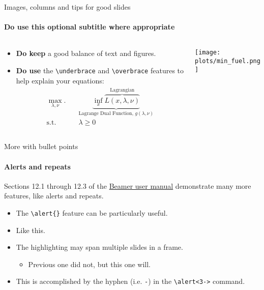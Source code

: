 \documentclass{beamer}
\newcommand{\hrefcol}[2]{\textcolor{uihteal}{\href{#1}{#2}}}
\begin{document}
\begin{frame}[fragile]{Images, columns and tips for good slides}
\framesubtitle{\textbf{Do use} this optional subtitle where appropriate}
\begin{columns}
\begin{column}{0.7\textwidth}
\begin{itemize}
    \item \textbf{Do keep} a good balance of text and figures.
    \item \textbf{Do use} the \verb|\underbrace| and \verb|\overbrace| features to help explain your equations:
\begin{equation*}
\begin{aligned}
\max_{\lambda, \nu}. \quad & \underbrace{\inf_x \overbrace{L(x, \lambda, \nu)}^\text{Lagrangian}}_\text{Lagrange Dual Function, $g(\lambda, \nu)$}\\
\textrm{s.t.} \quad & \lambda \geq 0
\end{aligned}
\end{equation*}
\end{itemize}


\end{column}
\begin{column}{0.3\textwidth}
\texttt{[image: plots/min\_fuel.png]}
\end{column}
\end{columns}
\end{frame}


\begin{frame}[fragile]{More with bullet points}
\framesubtitle{Alerts and repeats}
Sections 12.1 through 12.3 of the \hrefcol{https://www.ctan.org/tex-archive/macros/latex/contrib/beamer/doc/beameruserguide.pdf}{Beamer user
manual} demonstrate many more features, like alerts and repeats.
\begin{itemize}
\item The \verb|\alert{}| feature can be particularly useful.
\item Like \alert<2>{this}.
\item The highlighting may span multiple slides in a frame.
    \begin{itemize}
    \item Previous one did not, but \alert<3->{this one} will.
    \end{itemize}
\item This is accomplished by the \alert<4>{hyphen} (i.e. \texttt{-}) in the \verb|\alert<3->| command.
\end{itemize}
\end{frame}
\end{document}
